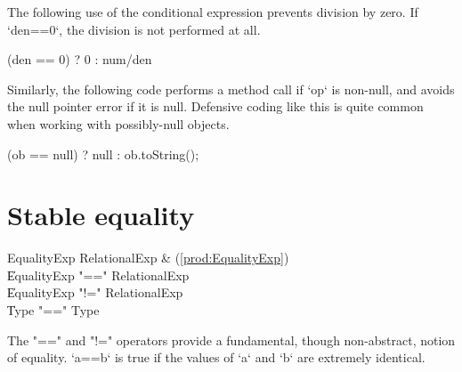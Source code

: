 \begin{ex}
The following use of the conditional expression prevents division by zero.  If
\xcd`den==0`, the division is not performed at all.
\begin{xten}
(den == 0) ? 0 : num/den
\end{xten}

Similarly, the following code performs a method call if \xcd`op` is non-null,
and avoids the null pointer error if it is null.  Defensive coding like this
is quite common when working with possibly-null objects.
\begin{xten}
(ob == null) ? null : ob.toString();
\end{xten}



\end{ex}

\section{Stable equality}
\label{StableEquality}
\index{\Xcd{==}}

\begin{bbgrammar}
 EqualityExp    \: RelationalExp & (\ref{prod:EqualityExp})\\
    \| EqualityExp \xcd"==" RelationalExp\\
    \| EqualityExp \xcd"!=" RelationalExp\\
    \| Type  \xcd"==" Type \\
\end{bbgrammar}


The \xcd"==" and \xcd"!=" operators provide a fundamental, though
non-abstract, notion of equality.  \xcd`a==b` is true if the values of \xcd`a`
and \xcd`b` are extremely identical.

